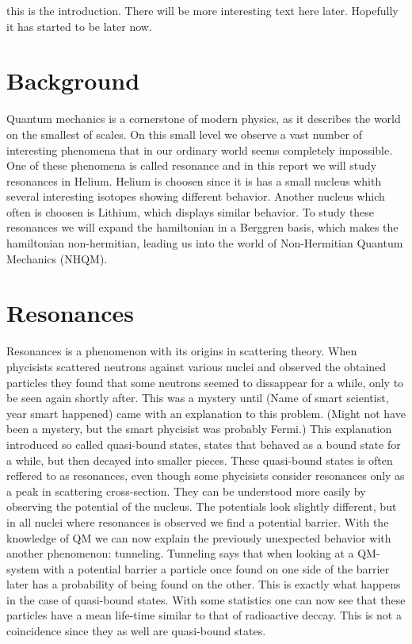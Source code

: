 this is the introduction. There will be more interesting text here later. Hopefully it has started to be later now.

\section{Background}
Quantum mechanics is a cornerstone of modern physics, as it describes the world on the smallest of scales.
On this small level we observe a vast number of interesting phenomena that in our ordinary world seems completely impossible.
One of these phenomena is called resonance and in this report we will study resonances in Helium.
Helium is choosen since it is has a small nucleus whith several interesting isotopes showing different behavior.
Another nucleus which often is choosen is Lithium, which displays similar behavior.
To study these resonances we will expand the hamiltonian in a Berggren basis, 
which makes the hamiltonian non-hermitian, leading us into the world of Non-Hermitian Quantum Mechanics (NHQM).


\section{Resonances}
Resonances is a phenomenon with its origins in scattering theory.
When phycisists scattered neutrons against various nuclei and observed the obtained particles they found that some neutrons seemed to dissappear for a while,
 only to be seen again shortly after.
This was a mystery until (Name of smart scientist, year smart happened) came with an explanation to this problem. (Might not have been a mystery, but the smart phycisist was probably Fermi.)
This explanation introduced so called quasi-bound states, states that behaved as a bound state for a while, but then decayed into smaller pieces.
These quasi-bound states is often reffered to as resonances, even though some phycisists consider resonances only as a peak in scattering cross-section.
They can be understood more easily by observing the potential of the nucleus.
The potentials look slightly different, but in all nuclei where resonances is observed we find a potential barrier.
With the knowledge of QM we can now explain the previously unexpected behavior with another phenomenon: tunneling.
Tunneling says that when looking at a QM-system with a potential barrier a particle once found on one side of the barrier later has a probability of being found on the other.
This is exactly what happens in the case of quasi-bound states.
With some statistics one can now see that these particles have a mean life-time similar to that of radioactive deccay.
This is not a coincidence since they as well are quasi-bound states.

